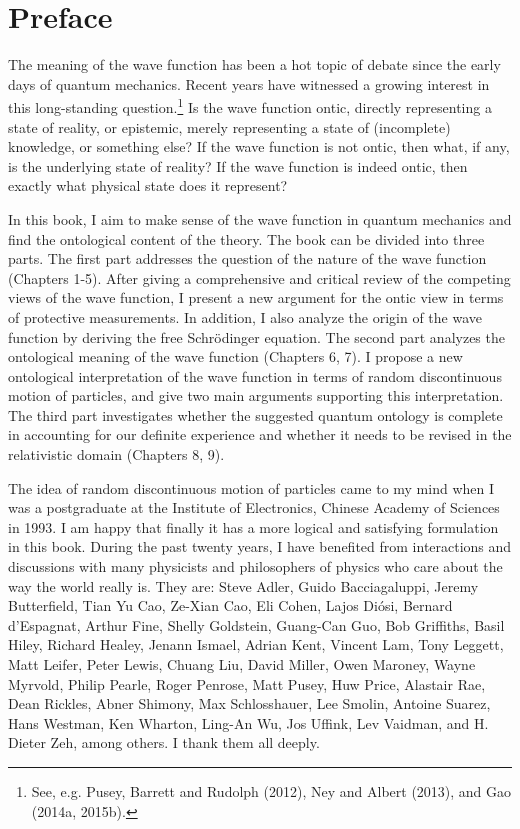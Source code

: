 \chapter*{Preface}

\vspace*{1cm}

The meaning of the wave function has been a hot topic of debate since the early days of quantum mechanics. Recent years have witnessed a growing interest in this long-standing question.\footnote{See, e.g. Pusey, Barrett and Rudolph (2012), Ney and Albert (2013), and Gao (2014a, 2015b).} Is the wave function ontic, directly representing a state of reality, or epistemic, merely representing a state of (incomplete) knowledge, or something else? If the wave function is not ontic, then what, if any, is the underlying state of reality? If the wave function is indeed ontic, then exactly what physical state does it represent? 

In this book, I aim to make sense of the wave function in quantum mechanics and find the ontological content of the theory. The book can be divided into three parts. The first part addresses the question of the nature of the wave function (Chapters 1-5). After giving a comprehensive and critical review of the competing views of the wave function, I present a new argument for the ontic view in terms of protective measurements. In addition, I also analyze the origin of the wave function by deriving the free Schr\"{o}dinger equation. The second part analyzes the ontological meaning of the wave function (Chapters 6, 7). I propose a new ontological interpretation of the wave function in terms of random discontinuous motion of particles, and give two main arguments supporting this interpretation. %
The third part investigates whether the suggested quantum ontology is complete in accounting for our definite experience and whether it needs to be revised in the relativistic domain (Chapters 8, 9).


The idea of random discontinuous motion of particles came to my mind when I was a postgraduate at the Institute of Electronics, Chinese Academy of Sciences in 1993. I am happy that finally it has a more logical and satisfying formulation in this book. 
During the past twenty years, I have benefited from interactions and discussions with many physicists and philosophers of physics who care about the way the world really is. They are: Steve Adler, Guido Bacciagaluppi, Jeremy Butterfield, Tian Yu Cao, Ze-Xian Cao, Eli Cohen, Lajos Di\'{o}si, Bernard d'Espagnat, Arthur Fine, Shelly Goldstein, Guang-Can Guo, Bob Griffiths, Basil Hiley, Richard Healey, Jenann Ismael, Adrian Kent,  Vincent Lam, Tony Leggett, Matt Leifer, Peter Lewis, Chuang Liu, David Miller, Owen Maroney, Wayne Myrvold, Philip Pearle, Roger Penrose, Matt Pusey, Huw Price, Alastair Rae, Dean Rickles, Abner Shimony, Max Schlosshauer, Lee Smolin, Antoine Suarez, Hans Westman, Ken Wharton, Ling-An Wu, Jos Uffink, Lev Vaidman, and H. Dieter Zeh, among others. I thank them all deeply.

